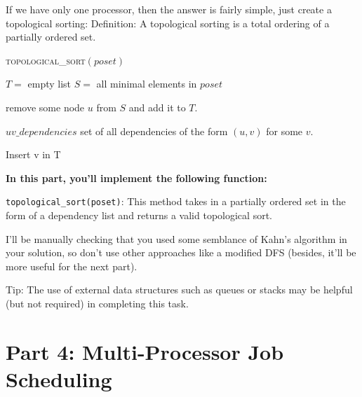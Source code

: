 \documentclass{article}
\begin{document}
    

    If we have only one processor, then the answer is fairly simple, just create a topological sorting: Definition: A topological sorting is a total ordering of a partially ordered set.

    

    \begin{algorithm}
        \caption{\textsc{topological\_sort}$(poset)$}\label{alg:cap}
        \label{alg:topological_sort}
        \begin{algorithmic}
            \State $T = $ empty list
            \State $S = $ all minimal elements in $poset$
            
                remove some node $u$ from $S$ and add it to $T$.

                \State $uv\_dependencies$ set of all dependencies of the form $(u, v)$ for some $v$.

                        Insert v in T
                    \EndIf

                \EndFor

            \EndWhile
            
                
            \State {}
        \end{algorithmic}
    \end{algorithm}


    \vspace{3mm}
    \begin{tcolorbox}[colback=yellow!30]
        \textbf{In this part, you'll implement the following function:}
        
        \lstinline{topological_sort(poset)}: This method takes in a partially ordered set in the form of a dependency list and returns a valid topological sort. 

        I'll be manually checking that you used some semblance of Kahn's algorithm in your solution, so don't use other approaches like a modified DFS (besides, it'll be more useful for the next part).

        Tip: The use of external data structures such as queues or stacks may be helpful (but not required) in completing this task.
    \end{tcolorbox}

\section*{Part 4: Multi-Processor Job Scheduling}
\end{document}
